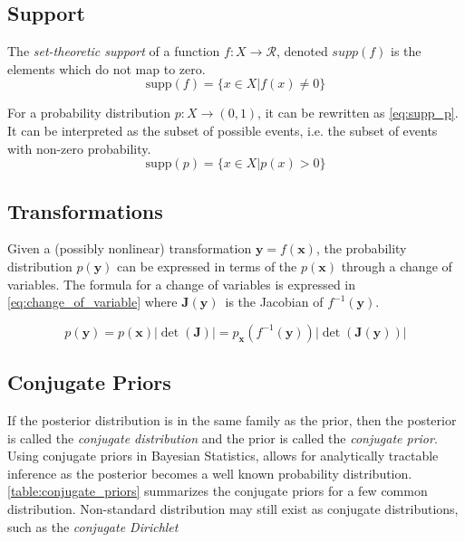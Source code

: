 \subsection{Support}
The \textit{set-theoretic support} of a function $f: X \to \mathcal{R}$, denoted $supp(f)$ is the elements which do not map to zero.
\begin{equation}
    \text{supp}(f) = \{x \in X | f(x) \neq 0\}
\end{equation}

For a probability distribution $p: X \to (0, 1)$, it can be rewritten as \cref{eq:supp_p}. It can be interpreted as the subset of possible events, i.e. the subset of events with non-zero probability. 
\begin{equation}\label{eq:supp_p}
    \text{supp}(p) = \{ x \in X | p(x) > 0 \}
\end{equation}

\subsection{Transformations}
Given a (possibly nonlinear) transformation $\mathbf{y} = f(\mathbf{x})$, the probability distribution $p(\mathbf{y})$ can be expressed in terms of the $p(\mathbf{x})$ through a change of variables. The formula for a change of variables is expressed in \cref{eq:change_of_variable} where $\boldsymbol{J}(\mathbf{y})$ is the Jacobian of $f^{-1}(\mathbf{y})$.

\begin{equation}\label{eq:change_of_variable}
    p(\mathbf{y}) = p(\mathbf{x}) | \det (\mathbf{J}) | = p_{\mathbf{x}}(f^{-1}(\mathbf{y})) | \det (\mathbf{J}(\mathbf{y})) |  
\end{equation}

\subsection{Conjugate Priors}\label{sec:theory_conjugate_priors}
If the posterior distribution is in the same family as the prior, then the posterior is called the \textit{conjugate distribution} and the prior is called the \textit{conjugate prior}. Using conjugate priors in Bayesian Statistics, allows for analytically tractable inference as the posterior becomes a well known probability distribution. \cref{table:conjugate_priors} summarizes the conjugate priors for a few common distribution. Non-standard distribution may still exist as conjugate distributions, such as the \textit{conjugate Dirichlet}


